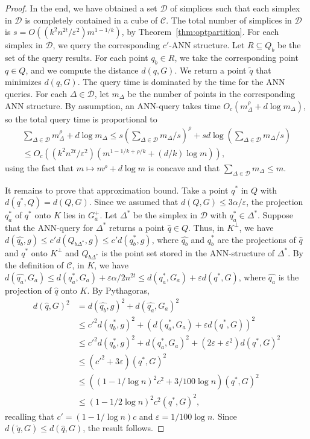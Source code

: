 \documentclass[a4paper,11pt]{paper}
\newcommand{\eps}{\varepsilon}
\begin{document}
\begin{proof}
  In the end, we have obtained a set $\mathcal{D}$ of simplices
  such that each simplex in $\mathcal{D}$ is completely contained in
  a cube of $\mathcal{C}$.
  The total number of simplices
  in $\mathcal{D}$ is $s = O((k^2n^{2t}/\eps^2)m^{1-1/k})$, by
  Theorem~\ref{thm:optpartition}.
  For each simplex in $\mathcal{D}$,
  we query the corresponding $c'$-ANN structure.
  Let $R \subseteq Q_b$ be the set of the query results.
  For each point $q_b \in R$, we take the corresponding point
  $q \in Q$, and we compute the distance $d(q, G)$.
  We return a point $\widetilde{q}$ that minimizes $d(q, G)$.
  The query time is dominated by the time for the ANN queries.
  For each $\Delta \in \mathcal{D}$, let $m_\Delta$ be the number
  of points in the corresponding ANN structure. By
  assumption, an ANN-query takes time
  $O_c(m_\Delta^\rho + d\log m_\Delta)$,
  so the total query time is proportional to
  \begin{multline*}
    \sum_{\Delta \in \mathcal{D}} m_\Delta^\rho + d\log m_\Delta \leq
    s \left( \sum_{\Delta \in \mathcal{D}} m_\Delta/s \right)^\rho  +
    s d \log \left( \sum_{\Delta \in \mathcal{D}} m_\Delta/s \right)\\
    \leq
    O_c\left((k^2n^{2t}/\eps^2)(m^{1-1/k+\rho/k} + (d/k)\log m)\right),
  \end{multline*}
  using the fact that $m \mapsto m^\rho + d\log m$ is concave and
  that $\sum_{\Delta \in \mathcal{D}} m_\Delta \leq m$.

  It remains to prove that approximation bound.
  Take a point $q^*$ in $Q$ with $d(q^*, Q) = d(Q, G)$. Since
  we assumed that $d(Q, G) \leq 3\alpha/\eps$, the projection
  $q^*_a$ of $q^*$ onto $K$ lies in $G_a^+$.
  Let $\Delta^*$ be the simplex in $\mathcal{D}$ with
  $q^*_a \in \Delta^*$. Suppose that the ANN-query for $\Delta^*$
  returns a point $\widehat{q} \in Q$.
  Thus, in $K^\perp$, we have
  $d(\widehat{q_b}, g) \leq c'd(Q_{b\Delta^*}, g) \leq
  c'd(q_b^*, g)$, where $\widehat{q_b}$ and $q^*_b$ are
  the projections of $\widehat{q}$ and $q^*$ onto $K^\perp$ and
  $Q_{b\Delta^*}$ is the point set stored in the ANN-structure of
  $\Delta^*$.
  By the definition of $\mathcal{C}$, in $K$, we have
  $d(\widehat{q_a}, G_a) \leq
  d(q_a^*, G_a) + \eps\alpha/2n^{2t} \leq
  d(q_a^*, G_a) + \eps d(q^*, G)$,
  where $\widehat{q_a}$ is the projection of $\widehat{q}$ onto $K$.
  By Pythagoras,
  \begin{align*}
    d(\widehat{q}, G)^2 &=
      d(\widehat{q_b}, g)^2 + d(\widehat{q_a}, G_a)^2\\
    &\leq
      c'^2d(q_b^*, g)^2
  + (d(q_a^*, G_a) + \eps d(q^*, G))^2\\
    &\leq
      c'^2d(q_b^*, g)^2
  + d(q_a^*, G_a)^2  + (2\eps + \eps^2)d(q^*, G)^2 \\
  &\leq
    (c'^2 + 3\eps)(q^*, G)^2\\
  &\leq
    \left((1-1/\log n)^2c^2 + 3/100\log n\right)(q^*, G)^2\\
  &\leq
    (1-1/2\log n)^2c^2(q^*, G)^2,
  \end{align*}
  recalling that $c' = (1-1/\log n)c$ and $\eps =
  1/100\log n$.
  Since $d(\widetilde{q}, G) \leq d(\widehat{q}, G)$,
  the result follows.
\end{proof}
\end{document}
